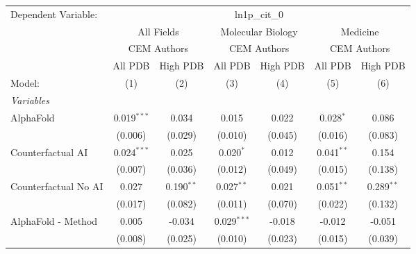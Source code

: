 \begingroup
\centering
\begin{tabular}{lcccccc}
   \tabularnewline \midrule \midrule
   Dependent Variable: & \multicolumn{6}{c}{ln1p\_cit\_0}\\
 & \multicolumn{2}{c}{All Fields} & \multicolumn{2}{c}{Molecular Biology} & \multicolumn{2}{c}{Medicine} \\
\cmidrule(lr){2-3} \cmidrule(lr){4-5} \cmidrule(lr){6-7}
 & \multicolumn{2}{c}{CEM Authors} & \multicolumn{2}{c}{CEM Authors} & \multicolumn{2}{c}{CEM Authors} \\
\cmidrule(lr){2-3} \cmidrule(lr){4-5} \cmidrule(lr){6-7}
 & \multicolumn{1}{c}{All PDB} & \multicolumn{1}{c}{High PDB} & \multicolumn{1}{c}{All PDB} & \multicolumn{1}{c}{High PDB} & \multicolumn{1}{c}{All PDB} & \multicolumn{1}{c}{High PDB} \\
\cmidrule(lr){2-2} \cmidrule(lr){3-3} \cmidrule(lr){4-4} \cmidrule(lr){5-5} \cmidrule(lr){6-6} \cmidrule(lr){7-7}
   Model:                                                     & (1)            & (2)          & (3)            & (4)     & (5)            & (6)\\  
   \midrule
   \emph{Variables}\\
   AlphaFold                                                  & 0.019$^{***}$  & 0.034        & 0.015          & 0.022   & 0.028$^{*}$    & 0.086\\   
                                                              & (0.006)        & (0.029)      & (0.010)        & (0.045) & (0.016)        & (0.083)\\   
   Counterfactual AI                                          & 0.024$^{***}$  & 0.025        & 0.020$^{*}$    & 0.012   & 0.041$^{**}$   & 0.154\\   
                                                              & (0.007)        & (0.036)      & (0.012)        & (0.049) & (0.015)        & (0.138)\\   
   Counterfactual No AI                                       & 0.027          & 0.190$^{**}$ & 0.027$^{**}$   & 0.021   & 0.051$^{**}$   & 0.289$^{**}$\\   
                                                              & (0.017)        & (0.082)      & (0.011)        & (0.070) & (0.022)        & (0.132)\\   
   AlphaFold - Method                                         & 0.005          & -0.034       & 0.029$^{***}$  & -0.018  & -0.012         & -0.051\\   
                                                              & (0.008)        & (0.025)      & (0.010)        & (0.023) & (0.015)        & (0.039)\\   

\end{tabular}
